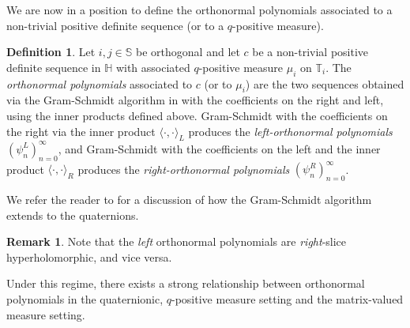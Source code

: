 \documentclass[11pt,reqno]{amsart}
\def\q{\psi}
\def\SS{\mathbb{S}}
\def\TT{\mathbb{T}}
\def\HH{\mathbb{H}}
\theoremstyle{definition}
\newtheorem{definition}[theorem]{Definition}
\newtheorem{remark}[theorem]{Remark}
\numberwithin{equation}{section}
\begin{document}
We are now in a position to define the orthonormal polynomials associated to a non-trivial positive definite sequence (or to a \(q\)-positive measure).

\begin{definition}
    Let \(i,j \in \SS\) be orthogonal and let \(c\) be a non-trivial positive definite sequence in \(\HH\) with associated \(q\)-positive measure \(\mu_i\) on \(\TT_i\). The \emph{orthonormal polynomials} associated to \(c\) (or to \(\mu_i\)) are the two sequences obtained via the Gram-Schmidt algorithm in with the coefficients on the right and left, using the inner products defined above. Gram-Schmidt with the coefficients on the right via the inner product \(\langle \cdot, \cdot \rangle_L\) produces the \emph{left-orthonormal polynomials}  \((\q_n^L)_{n=0}^{\infty}\), and Gram-Schmidt with the coefficients on the left and the inner product \(\langle \cdot, \cdot \rangle_R\) produces the \emph{right-orthonormal polynomials} \((\q_n^R)_{n=0}^{\infty}\). 
\end{definition}

We refer the reader to \cite[Theorem 4.3]{FP03} for a discussion of how the Gram-Schmidt algorithm extends to the quaternions.

\begin{remark}
	Note that the \emph{left} orthonormal polynomials are \emph{right}-slice hyperholomorphic, and vice versa.
\end{remark}

Under this regime, there exists a strong relationship between orthonormal polynomials in the quaternionic, \(q\)-positive measure setting and the matrix-valued measure setting.
\end{document}
